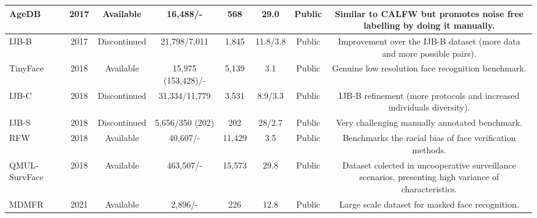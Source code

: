 \documentclass[class=report, crop=false, a4paper, 12pt]{standalone}
\begin{document}
\begin{table}[!ht]
{\begin{tabular}{|l|c|c|c|c|c|c|c|}
    AgeDB~\autocite{moschoglouAgeDBFirstManually2017}                                  & 2017          & Available                  & 16,488/-               & 568          & 29.0                   & Public                & Similar to CALFW but promotes noise free labelling by doing it manually.                 \\ \hline
    IJB-B~\autocite{whitelamIARPAJanusBenchmarkB2017}                                 & 2017          & Discontinued                  & 21,798/7,011                  & 1,845           & 11.8/3.8                   & Public                & Improvement over the IJB-B dataset (more data and more possible pairs).                 \\ \hline
    TinyFace~\autocite{chengLowResolutionFaceRecognition2019}                               & 2018          & Available                  & 15,975 (153,428)/-                  & 5,139           & 3.1                   & Public                & Genuine low resolution face recognition benchmark.                 \\ \hline
    IJB-C~\autocite{mazeIARPAJanusBenchmark2018}                                  & 2018          & Discontinued                  & 31,334/11,779                 & 3,531            & 8.9/3.3                  & Public                & IJB-B refinement (more protocols and increased individuals diversity).                 \\ \hline
    IJB-S~\autocite{kalkaIJBIARPAJanus2018}                                  & 2018          & Discontinued                  & 5,656/350 (202)                 & 202            & 28/2.7                  & Public                & Very challenging manually annotated benchmark.                 \\ \hline
    RFW~\autocite{wangRacialFacesWild2019}                                    & 2018 & Available                  & 40,607/-                  & 11,429            & 3.5                 & Public                & Benchmarks the racial bias of face verification methods.                 \\ \hline          
    QMUL-SurvFace~\autocite{chengSurveillanceFaceRecognition2018}                          & 2018          & Available                  & 463,507/-                  & 15,573            & 29.8                 & Public                & Dataset colected in uncooperative surveillance scenarios, presenting high variance of characteristics.                  \\ \hline
    MDMFR~\autocite{ullahNovelDeepMaskNetModel2022}                                  & 2021          & Available                  & 2,896/-                  & 226            & 12.8                 & Public                & Large scale dataset for masked face recognition.                 \\ \hline

\end{tabular}}
\end{table}
\end{document}
